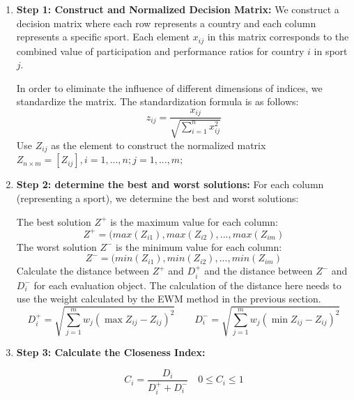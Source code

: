\documentclass[12pt]{article}  %
\begin{document}
\begin{enumerate}[\textbullet]
    \item \textbf{Step 1: Construct and Normalized Decision Matrix:} We construct a decision matrix where each row represents a country and each column represents a specific sport. Each element $x_{ij}$ in this matrix corresponds to the combined value of participation and performance ratios for country $i$ in sport $j$.

    In order to eliminate the influence of different dimensions of indices, we standardize the matrix. The standardization formula is as follows:
    \begin{equation}
        z_{ij} = \frac{x_{ij}}{\sqrt{\sum_{i=1}^{n} x_{ij}^2}}\tag{22}
    \end{equation}
    Use $Z_{ij}$ as the element to construct the normalized matrix $Z_{n×m}=[Z_{ij}],i=1,...,n; j=1,...,m;$
    
    \item \textbf{Step 2: determine the best and worst solutions:} For each column (representing a sport), we determine the best and worst solutions:

    The best solution $Z^+$ is the maximum value for each column:
    \begin{equation}
        Z^+=(max(Z_{i1}),max(Z_{i2}),...,max(Z_{im})\tag{23}
    \end{equation}
    The worst solution $Z^-$ is the minimum value for each column:
    \begin{equation}
        Z^-=(min(Z_{i1}),min(Z_{i2}),...,min(Z_{im})\tag{24}
    \end{equation}
    Calculate the distance between $Z^+$ and $D_i^+$ and the distance between $Z^-$ and $D_i^-$ for each evaluation object. The calculation of the distance here needs to use the weight calculated by the EWM method in the previous section.
    \begin{equation}
        D_i^+ = \sqrt{\sum_{j=1}^{m} w_j (\max Z_{ij} - Z_{ij})^2} \quad \quad D_i^- = \sqrt{\sum_{j=1}^{m} w_j (\min Z_{ij} - Z_{ij})^2}\tag{25}
    \end{equation}

    \item \textbf{Step 3: Calculate the Closeness Index:  } 
    
    \begin{equation}
        C_i = \frac{D_i}{D_i^+ + D_i^-} \quad 0 \leq C_i \leq 1\tag{26}
    \end{equation}
    

\end{enumerate}
\end{document}
